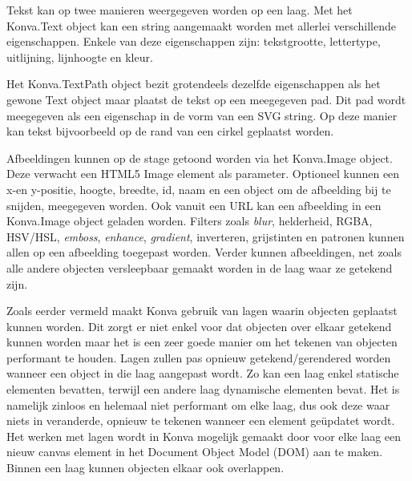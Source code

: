 Tekst kan op twee manieren weergegeven worden op een laag. Met het Konva.Text object kan een string aangemaakt worden met allerlei verschillende eigenschappen. Enkele van deze eigenschappen zijn: tekstgrootte, lettertype, uitlijning, lijnhoogte en kleur. 

Het Konva.TextPath object bezit grotendeels dezelfde eigenschappen als het gewone Text object maar plaatst de tekst op een meegegeven pad. Dit pad wordt meegegeven als een eigenschap in de vorm van een SVG string. Op deze manier kan tekst bijvoorbeeld op de rand van een cirkel geplaatst worden. 

Afbeeldingen kunnen op de stage getoond worden via het Konva.Image object. Deze verwacht een HTML5 Image element als parameter. Optioneel kunnen een x-en y-positie, hoogte, breedte, id, naam en een object om de afbeelding bij te snijden, meegegeven worden. Ook vanuit een URL kan een afbeelding in een Konva.Image object geladen worden. Filters zoals \textit{blur}, helderheid, RGBA, HSV/HSL, \textit{emboss}, \textit{enhance}, \textit{gradient}, inverteren, grijstinten en patronen kunnen allen op een afbeelding toegepast worden. Verder kunnen afbeeldingen, net zoals alle andere objecten versleepbaar gemaakt worden in de laag waar ze getekend zijn. 

Zoals eerder vermeld maakt Konva gebruik van lagen waarin objecten geplaatst kunnen worden. Dit zorgt er niet enkel voor dat objecten over elkaar getekend kunnen worden maar het is een zeer goede manier om het tekenen van objecten performant te houden. Lagen zullen pas opnieuw getekend/gerendered worden wanneer een object in die laag aangepast wordt. Zo kan een laag enkel statische elementen bevatten, terwijl een andere laag dynamische elementen bevat. Het is namelijk zinloos en helemaal niet performant om elke laag, dus ook deze waar niets in veranderde, opnieuw te tekenen wanneer een element ge\"{u}pdatet wordt. Het werken met lagen wordt in Konva mogelijk gemaakt door voor elke laag een nieuw canvas element in het Document Object Model (DOM) aan te maken. Binnen een laag kunnen objecten elkaar ook overlappen. 

